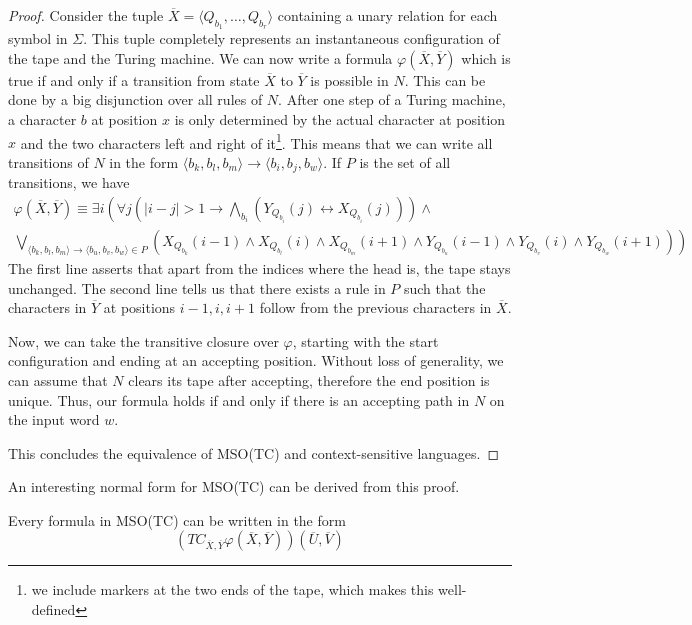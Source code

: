 \begin{proof}
    Consider the tuple $\overline{X} = \langle Q_{b_1}, \dots, Q_{b_r} \rangle$ containing a unary relation for each symbol in $\Sigma$.
    This tuple completely represents an instantaneous configuration of the tape and the Turing machine.
    We can now write a formula $\varphi(\overline{X}, \overline{Y})$ which is true if and only if a transition from state $\overline{X}$ to $\overline{Y}$ is possible in $N$.
    This can be done by a big disjunction over all rules of $N$.
    After one step of a Turing machine, a character $b$ at position $x$ is only determined by the actual character at position $x$ and the two characters left and right of it\footnote{we include markers at the two ends of the tape, which makes this well-defined}.
    This means that we can write all transitions of $N$ in the form $\langle b_{k},b_{l},b_{m}\rangle \to \langle b_{i}, b_{j}, b_{w} \rangle$.
    If $P$ is the set of all transitions, we have
    \begin{multline*}
        \varphi(\overline{X}, \overline{Y}) \equiv \exists i \left(\forall j \left(|i - j| > 1 \to \bigwedge_{b_i}\left(Y_{Q_{b_i}}(j) \leftrightarrow X_{Q_{b_i}}(j)\right)\right) \land \right. \\
        \left. \bigvee_{\langle b_{k},b_{l},b_{m}\rangle \to \langle b_{u}, b_{v}, b_{w} \rangle \in P} \left(X_{Q_{b_{k}}}(i - 1) \land X_{Q_{b_{l}}}(i) \land X_{Q_{b_{m}}}(i + 1) \land Y_{Q_{b_{u}}}(i - 1) \land Y_{Q_{b_{v}}}(i) \land Y_{Q_{b_{w}}}(i + 1) \right)\right)
    \end{multline*}
    The first line asserts that apart from the indices where the head is, the tape stays unchanged.
    The second line tells us that there exists a rule in $P$ such that the characters in $\overline{Y}$ at positions $i - 1, i, i + 1$ follow from the previous characters in $\overline{X}$.

    Now, we can take the transitive closure over $\varphi$, starting with the start configuration and ending at an accepting position.
    Without loss of generality, we can assume that $N$ clears its tape after accepting, therefore the end position is unique.
    Thus, our formula holds if and only if there is an accepting path in $N$ on the input word $w$.

    This concludes the equivalence of MSO(TC) and context-sensitive languages.
\end{proof}

An interesting normal form for MSO(TC) can be derived from this proof.
\begin{corollary}
    \label{cor:normalmso}
    Every formula in MSO(TC) can be written in the form
    \[
        \left( TC_{\overline{X}, \overline{Y}} \varphi(\overline{X}, \overline{Y}) \right)\left( \overline{U}, \overline{V} \right)
    \]
\end{corollary}

